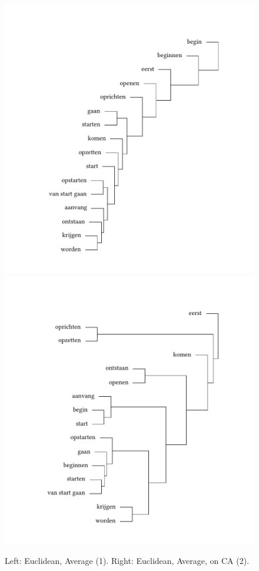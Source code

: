 \begin{figure}
\includegraphics[width=.48\textwidth,trim=95 40 75 75]{figures/tree30.pdf}\hfill%
\includegraphics[width=.48\textwidth,trim=95 40 75 75]{figures/tree31.pdf}
\caption{\label{fig:3:30}Left: Euclidean, Average (1). Right:\label{fig:3:31} Euclidean, Average, on CA (2).}
\end{figure}

